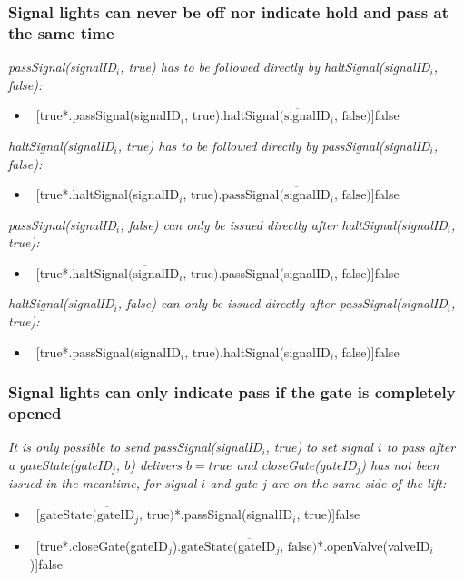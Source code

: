 \subsubsection{Signal lights can never be off nor indicate hold and pass at the same time}
\textit{passSignal(signalID$_i$, true) has to be followed directly by haltSignal(signalID$_i$, false):}
\begin{itemize}
	\item ~[true*.passSignal(signalID$_i$, true).$\overline{\textrm{haltSignal(signalID$_i$, false)}}$]false
\end{itemize}
\textit{haltSignal(signalID$_i$, true) has to be followed directly by passSignal(signalID$_i$, false):}
\begin{itemize}
	\item ~[true*.haltSignal(signalID$_i$, true).$\overline{\textrm{passSignal(signalID$_i$, false)}}$]false
\end{itemize}
\textit{passSignal(signalID$_i$, false) can only be issued directly after haltSignal(signalID$_i$, true):}
\begin{itemize}
	\item ~[true*.$\overline{\textrm{haltSignal(signalID$_i$, true)}}$.passSignal(signalID$_i$, false)]false
\end{itemize}
\textit{haltSignal(signalID$_i$, false) can only be issued directly after passSignal(signalID$_i$, true):}
\begin{itemize}
	\item ~[true*.$\overline{\textrm{passSignal(signalID$_i$, true)}}$.haltSignal(signalID$_i$, false)]false
\end{itemize}

\subsubsection{Signal lights can only indicate pass if the gate is completely opened}
\textit{It is only possible to send passSignal(signalID$_i$, true) to set signal $i$ to pass after a gateState(gateID$_j$, $ b $) delivers $b = true$ and closeGate(gateID$_j$) has not been issued in the meantime, for signal $i$ and gate $j$ are on the same side of the lift:}
\begin{itemize}
	\item ~[$\overline{\textrm{gateState(gateID$_j$, true)}}$*.passSignal(signalID$_i$, true)]false
	\item ~[true*.closeGate(gateID$_j$).$\overline{\textrm{gateState(gateID$_j$, false)}}$*.openValve(valveID$_i$)]false
\end{itemize}

